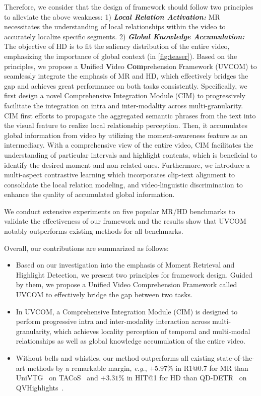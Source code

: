 \documentclass[10pt,twocolumn,letterpaper]{article}
\begin{document}
Therefore, we consider that the design of framework should follow two principles to alleviate the above weakness: 1) \textit{\textbf{Local Relation Activation:}} MR necessitates the understanding of local relationships within the video to accurately localize specific segments. 2) \textit{\textbf{Global Knowledge Accumulation:}} The objective of HD is to fit the saliency distribution of the entire video, emphasizing the importance of global context (in \cref{fig:teaser}). Based on the principles, we propose a \textbf{U}nified \textbf{V}ideo \textbf{Com}prehension Framework (UVCOM) to seamlessly integrate the emphasis of MR and HD, which effectively bridges the gap and achieves great performance on both tasks consistently. 
Specifically, we first design a novel Comprehensive Integration Module (CIM) to progressively facilitate the integration on intra and inter-modality across multi-granularity.
CIM first efforts to propagate the aggregated semantic phrases from the text into the visual feature to realize local relationship perception.
Then, it accumulates global information from video by utilizing the moment-awareness feature as an intermediary.
With a comprehensive view of the entire video, CIM facilitates the understanding of particular intervals and highlight contents, which is beneficial to identify the desired moment and non-related ones. 
Furthermore, we introduce a multi-aspect contrastive learning which incorporates clip-text alignment to consolidate the local relation modeling, and video-linguistic discrimination to enhance the quality of accumulated global information.

We conduct extensive experiments on five popular MR/HD benchmarks  
to validate the effectiveness of our framework and the results show that UVCOM notably outperforms existing methods for all benchmarks.

Overall, our contributions are summarized as follows:
\begin{itemize}
    \item Based on our investigation into the emphasis of Moment Retrieval and Highlight Detection, we present two principles for framework design. Guided by them, we propose a Unified Video Comprehension Framework called UVCOM to effectively bridge the gap between two tasks.
    \item In UVCOM, a Comprehensive Integration Module (CIM) is designed to perform progressive intra and inter-modality interaction across multi-granularity, which achieves locality perception of temporal and multi-modal relationships as well as global knowledge accumulation of the entire video.
    \item Without bells and whistles, our method outperforms all existing state-of-the-art methods by a remarkable margin, \textit{e.g.}, $+5.97$\% in R1@0.7 for MR than UniVTG~\cite{univtg} on TACoS~\cite{tacos} and $+3.31$\% in HIT@1 for HD than QD-DETR~\cite{qddetr} on QVHighlights~\cite{momentdetr}.
\end{itemize}
\end{document}
